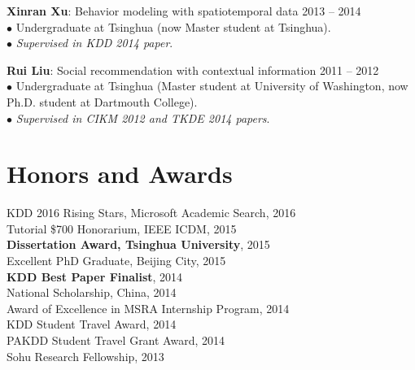 \documentclass[margin, 10pt]{res}
\begin{document}
\begin{resume}
{\textbf{Xinran Xu}: Behavior modeling with spatiotemporal data} \hfill{2013 -- 2014} \\
$\bullet$ Undergraduate at Tsinghua (now Master student at Tsinghua). \\
$\bullet$ \textit{Supervised in KDD 2014 paper}.

{\textbf{Rui Liu}: Social recommendation with contextual information} \hfill{2011 -- 2012} \\
$\bullet$ Undergraduate at Tsinghua (Master student at University of Washington, now Ph.D. student at Dartmouth College). \\
$\bullet$ \textit{Supervised in CIKM 2012 and TKDE 2014 papers}.



\section{Honors and Awards}

{KDD 2016 Rising Stars, Microsoft Academic Search}, 2016 \\
{Tutorial \$700 Honorarium, IEEE ICDM}, 2015 \\
\textbf{Dissertation Award, Tsinghua University}, 2015 \\
{Excellent PhD Graduate, Beijing City}, 2015 \\
\textbf{KDD Best Paper Finalist}, 2014 \\
{National Scholarship, China}, 2014 \\
{Award of Excellence in MSRA Internship Program}, 2014 \\
{KDD Student Travel Award}, 2014 \\
{PAKDD Student Travel Grant Award}, 2014 \\
{Sohu Research Fellowship}, 2013


\end{resume}
\end{document}
